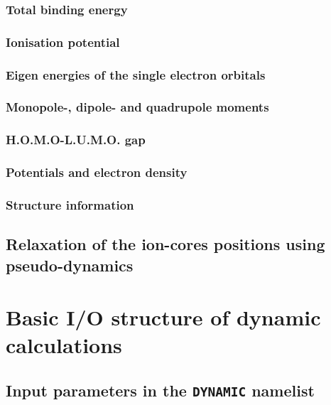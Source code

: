 \documentclass[11pt,a4paper]{article}
\begin{document}
			\subsubsection{Total binding energy}
			\subsubsection{Ionisation potential}
			\subsubsection{Eigen energies of the single electron orbitals}
			\subsubsection{Monopole-, dipole- and quadrupole moments}
			\subsubsection{H.O.M.O-L.U.M.O. gap}
			\subsubsection{Potentials and electron density}
			\subsubsection{Structure information}

		
			
		\subsection{Relaxation of the ion-cores positions using pseudo-dynamics}

	\section{Basic I/O structure of dynamic calculations}
		\subsection{Input parameters in the \texttt{DYNAMIC} namelist}
		
\end{document}
